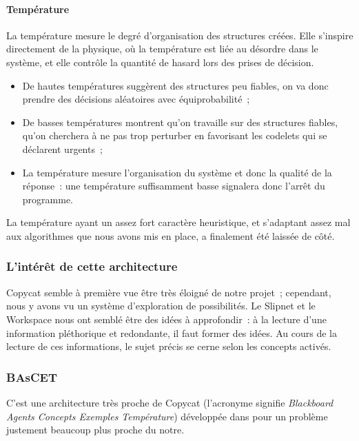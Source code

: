 \documentclass[a4paper, 12pt]{article}
\begin{document}
\paragraph{Température}
La température mesure le degré d'organisation des structures créées. Elle s'inspire directement de la physique, où la température est liée au désordre dans le système, et elle contrôle la quantité de hasard lors des prises de décision.
\begin{itemize}
 \item De hautes températures suggèrent des structures peu fiables, on va donc prendre des décisions aléatoires avec équiprobabilité~;
 \item De basses températures montrent qu'on travaille sur des structures fiables, qu'on cherchera à ne pas trop perturber en favorisant les codelets qui se déclarent urgents~;
 \item La température mesure l'organisation du système et donc la qualité de la réponse~: une température suffisamment basse signalera donc l'arrêt du programme.
\end{itemize}

La température ayant un assez fort caractère heuristique, et s'adaptant assez mal aux algorithmes que nous avons mis en place, a finalement été laissée de côté.

\subsubsection{L'intérêt de cette architecture}

Copycat semble à première vue être très éloigné de notre projet~; cependant, nous y avons vu un système d'exploration de possibilités. Le Slipnet et le Workspace nous ont semblé être des idées à approfondir~: à la lecture d'une information pléthorique et redondante, il faut former des idées. Au cours de la lecture de ces informations, le sujet précis se cerne selon les concepts activés.

\subsubsection{BAsCET}

C'est une architecture très proche de Copycat (l'acronyme signifie \textit{Blackboard Agents Concepts Exemples Température}) développée dans \cite{parmentier_specification_1998} pour un problème justement beaucoup plus proche du notre.
\end{document}
